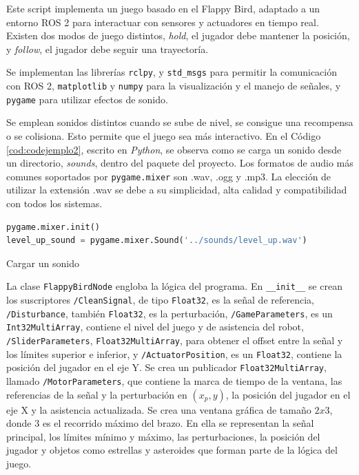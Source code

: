 Este script implementa un juego basado en el Flappy Bird, adaptado a un entorno ROS 2 para interactuar con sensores y actuadores en tiempo real.
Existen dos modos de juego distintos, \textit{hold}, el jugador debe mantener la posición, y \textit{follow}, el jugador debe seguir una trayectoría.

Se implementan las librerías \verb|rclpy|, y \verb|std_msgs| para permitir la comunicación con ROS 2, \verb|matplotlib| y \verb|numpy| para la visualización y el manejo de señales, y \verb|pygame| para utilizar efectos de sonido.

Se emplean sonidos distintos cuando se sube de nivel, se consigue una recompensa o se colisiona.
Esto permite que el juego sea más interactivo.
En el Código \ref{cod:codejemplo2}, escrito en \textit{Python}, se observa como se carga un sonido desde un directorio, \textit{sounds}, dentro del paquete del proyecto.
Los formatos de audio más comunes soportados por \verb|pygame.mixer| son .wav, .ogg y .mp3.
La elección de utilizar la extensión .wav se debe a su simplicidad, alta calidad y compatibilidad con todos los sistemas.

\begin{code}[h]
\begin{lstlisting}[language=Python]
pygame.mixer.init()
level_up_sound = pygame.mixer.Sound('../sounds/level_up.wav')
\end{lstlisting}
\caption[Cargar un sonido]{Cargar un sonido}
\label{cod:codejemplo2}
\end{code}

La clase \verb|FlappyBirdNode| engloba la lógica del programa.
En \verb|__init__| se crean los suscriptores \verb|/CleanSignal|, de tipo \verb|Float32|, es la señal de referencia, \verb|/Disturbance|, también \verb|Float32|, es la perturbación, \verb|/GameParameters|, es un \verb|Int32MultiArray|, contiene el nivel del juego y de asistencia del robot, \verb|/SliderParameters|, \verb|Float32MultiArray|, para obtener el offset entre la señal y los límites superior e inferior, y \verb|/ActuatorPosition|, es un \verb|Float32|, contiene la posición del jugador en el eje Y.
Se crea un publicador \verb|Float32MultiArray|, llamado \verb|/MotorParameters|, que contiene la marca de tiempo de la ventana, las referencias de la señal y la perturbación en $(x_p, y)$, la posición del jugador en el eje X y la asistencia actualizada.
Se crea una ventana gráfica de tamaño $2x3$, donde 3 es el recorrido máximo del brazo.
En ella se representan la señal principal, los límites mínimo y máximo, las perturbaciones, la posición del jugador y objetos como estrellas y asteroides que forman parte de la lógica del juego.

